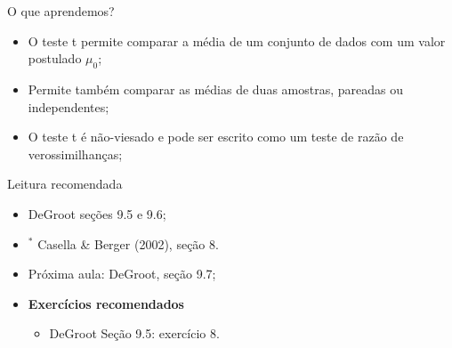 \begin{frame}{O que aprendemos?}
\begin{itemize}
  \item[\faLightbulbO] O teste t permite comparar a média de um conjunto de dados com um valor postulado $\mu_0$;    
  \item[\faLightbulbO] Permite também comparar as médias de duas amostras, pareadas ou independentes;
  \item O teste t é não-viesado e pode ser escrito como um teste de razão de verossimilhanças;
   \end{itemize}
 \end{frame}

\begin{frame}{Leitura recomendada}
\begin{itemize}
 \item[\faBook] DeGroot seções 9.5 e 9.6;
 \item[\faBook] $^\ast$ Casella \& Berger (2002), seção 8.
 \item[\faForward] Próxima aula: DeGroot, seção 9.7;
 \item {\large\textbf{Exercícios recomendados}}
  \begin{itemize}
   \item[\faBookmark] DeGroot Seção 9.5: exercício 8.
  \end{itemize}
 \end{itemize} 
\end{frame}
